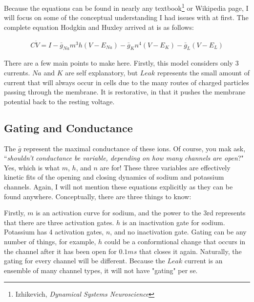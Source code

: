 \documentclass[12pt]{report}
\begin{document}
Because the equations can be found in nearly any textbook\footnote{Izhikevich, \textit{Dynamical Systems Neuroscience}} or Wikipedia page, I will focus on some of the conceptual understanding I had issues with at first. The complete equation Hodgkin and Huxley arrived at is as follows: 

\bigskip

\begin{equation} \label{hh2}
\begin{split}
C\dot{V} = I - \bar{g}_{Na}m^3h(V - E_{Na}) - \bar{g}_{K}n^4(V - E_{K}) - \bar{g}_{L}(V - E_{L})
\end{split}
\end{equation}

\bigskip 

There are a few main points to make here. Firstly, this model considers only 3 currents. $Na$ and $K$ are self explanatory, but $Leak$ represents the small amount of current that will always occur in cells due to the many routes of charged particles passing through the membrane. It is restorative, in that it pushes the membrane potential back to the resting voltage.\newline

\subsection{Gating and Conductance} 

\label{sec:GatingandConductance}

The $\bar{g}$ represent the maximal conductance of these ions. Of course, you mak ask, ``\textit{shouldn't conductance be variable, depending on how many channels are open}?" Yes, which is what $m$, $h$, and $n$ are for! These three variables are effectively kinetic fits of the opening and closing dynamics of sodium and potassium channels. Again, I will not mention these equations explicitly as they can be found anywhere. Conceptually, there are three things to know:\newline

Firstly, $m$ is an activation curve for sodium, and the power to the 3rd represents that there are three activation gates. $h$ is an inactivation gate for sodium. Potassium has 4 activation gates, $n$, and no inactivation gate. Gating can be any number of things, for example, $h$ could be a conformtional change that occurs in the channel after it has been open for $0.1 ms$ that closes it again. Naturally, the gating for every channel will be different. Because the $Leak$ current is an ensemble of many channel types, it will not have "gating" per se.\newline
\end{document}
